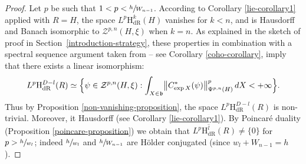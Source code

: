 \documentclass[JEP,XML,SOM,Unicode,published]{cedram}
\newcommand{\dR}{\mathrm{dR}}
\newcommand{\rH}{\mathrm{H}}
\newcommand{\frb}{\mathfrak{b}}
\theoremstyle{plain}
\theoremstyle{remark}
\theoremstyle{definition}
\begin{document}
\begin{proof} Let $p$ be such that $1<p<\sfrac{h}{W_{n-1}}$. According to Corollary \ref{lie-corollary1} applied with $R=H$, the space $L^p\rH_\dR^{k} (H)$ vanishes for $k<n$, and is Hausdorff and Banach isomorphic to $\mathcal Z^{p, n} (H, \xi)$ when $k=n$. As explained in the sketch of proof in Section~\ref{introduction-strategy}, these properties in combination with a spectral sequence argument taken from \cite{BR} -- see Corollary \ref{coho-corollary}, imply that there exists a linear isomorphism:
\[
L^p \rH_\dR^{D-l}(R) \simeq \Bigl\{\psi \in \mathcal Z^{p, n} (H, \xi): \int_{X \in \frb} \bigl\Vert C^*_{\exp X} (\psi) \bigr\Vert_{\Psi^{p,n}(H)}^p \,dX < +\infty \Bigr\}.
\]
Thus by Proposition \ref{non-vanishing-proposition}, the space $L^p\rH_\dR^{D-l}(R)$ is non-trivial. Moreover, it Hausdorff (see Corollary \ref{lie-corollary1}). By Poincaré duality (Proposition \ref{poincare-proposition}) we obtain that $L^p\overline{\rH_\dR^l}(R) \neq \{0\}$ for $p >\sfrac{h}{w_l}$; indeed $\sfrac{h}{w_l}$ and $\sfrac{h}{W_{n-1}}$ are Hölder conjugated (since $w_l + W_{n-1} = h$).
\end{proof}
\end{document}
